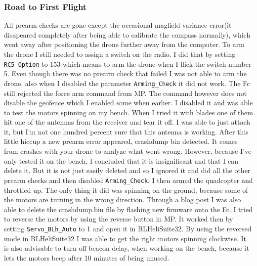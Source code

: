 \documentclass{article}
\begin{document}
	\subsubsection{Road to First Flight}
	All prearm checks are gone except the occasional magfield variance error(it disapeared completely after being able to calibrate the compass normally), which went away after positioning the drone further away from the computer. To arm
	the drone I still needed to assign a switch on the radio. I did that by setting \lstinline|RC5_Option| to 153 which means to arm the drone when I flick the switch number 5. Even though there was no prearm check that failed I was not able to arm the drone, also when I disabled the parameter \lstinline|Arming_Check| it did not work. The Fc still rejected the force arm command from MP. The command however does not disable the geofence which I enabled some when earlier. I disabled it and was able to test the motors spinning on my bench. When I tried it with blades one of them hit one of the antennas from the receiver and tear it off. I was able to just attach it, but I'm not one hundred percent sure that this antenna is working. After this little hiccup a new prearm error appeared, crashdump bin detected. It comes from crashes with your drone to analyze what went wrong. 
	However, because I've only tested it on the bench, I concluded that it is insignificant and that I can delete it. But it is not just easily deleted and so I ignored it and did all the other prearm checks and then disabled \lstinline|Arming_Check|. I then armed the quadcopter and throttled up. The only thing it did was spinning on the ground, because some of the motors are turning in the wrong direction. Through a blog post\cite{blogcrashdump} I was also able to delete the crashdump.bin file by flashing new firmware onto the Fc. I tried to reverse the motors by using the reverse button in MP. It worked then by setting \lstinline|Servo_BLh_Auto| to 1 and open it in BLHeliSuite32\cite{BLHeliSuite32}. By using the reversed mode in BLHeliSuite32 I was able to get the right motors spinning clockwise. It is also advisable to turn off beacon delay, when working on the bench, because it lets the motors beep after 10 minutes of being unused.
	
\end{document}
